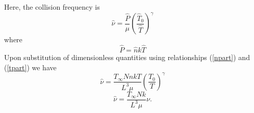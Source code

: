 %
Here, the collision frequency is
%
\begin{equation*}
\hat{\nu} = \frac{\hat{P}}{\mu} \left( \frac{\hat{T}_0}{\hat{T}} \right) ^{\gamma}
\end{equation*}
%
where
%
\begin{equation*}
\hat{P} = \hat{n} k \hat{T}
\end{equation*}
%
Upon substitution of dimensionless quantities using relationships (\ref{npart}) and (\ref{tpart}) we have 
%
\begin{equation*}
\hat{\nu} = \frac{T_\infty N n k T}{L^3 \mu} \left( \frac{T_0}{T} \right) ^{\gamma}
\end{equation*}
%
\begin{equation}
\label{nu}
\hat{\nu} = \frac{T_\infty N k}{L^3 \mu} \nu.
\end{equation}
%
%
%
%
%
%
%
%
%
%
